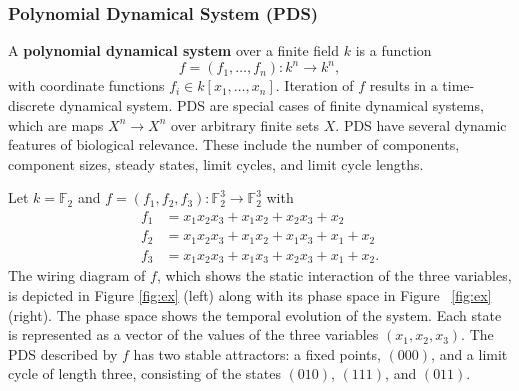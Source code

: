 \documentclass[11pt]{amsart}
\newenvironment{example}[1][Example]{\begin{trivlist}
\item[\hskip \labelsep {\bfseries #1}]}{\end{trivlist}}
\begin{document}
\subsubsection{Polynomial Dynamical System (PDS)}
A {\bf polynomial dynamical system} \cite{JLSS} over a finite field $k$ is a function
$$f = (f_1, \ldots, f_n) : k^n \rightarrow k^n,$$
with coordinate functions $f_i \in k[x_1, \ldots , x_n]$. Iteration of $f$ results
in a time-discrete dynamical system. PDS are special cases of finite
dynamical systems, which are maps $X^n \rightarrow   X^n$ over arbitrary
finite sets $X$.
PDS have several dynamic features of biological
relevance. These include the number of components, component sizes, steady states, limit cycles, and limit cycle lengths.
\begin{example}
Let $k= \mathbb F_2$ and $f = (f_1, f_2, f_3) : \mathbb F_2^3 \rightarrow
\mathbb F_2^3$ with
\begin{align*}
f_1 &= x_1x_2x_3+x_1x_2+x_2x_3+x_2 \\
f_2 &= x_1x_2x_3+x_1x_2+x_1x_3+x_1+x_2 \\
f_3 &= x_1x_2x_3+x_1x_3+x_2x_3+x_1+x_2.
\end{align*}
The wiring diagram of $f$, which shows the static interaction of the three
variables, is
depicted in Figure \ref{fig:ex} (left) along with its phase space in Figure
~\ref{fig:ex} (right).
The phase space shows the temporal evolution of the system. Each state is
represented as a vector of the values of the three variables $(x_1, x_2,
x_3)$.
The PDS described by $f$ has
two stable attractors: a fixed points, $(000)$, and a limit cycle of length
three, consisting of the states $(010)$, $(111)$, and $(011)$.
\end{example}
\end{document}
